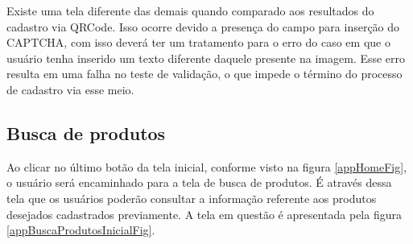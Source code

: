 Existe uma tela diferente das demais quando comparado aos resultados do cadastro via QRCode. Isso ocorre devido a presença do campo para inserção do CAPTCHA, com isso deverá ter um tratamento para o erro do caso em que o usuário tenha inserido um texto diferente daquele presente na imagem. Esse erro resulta em uma falha no teste de validação, o que impede o término do processo de cadastro via esse meio.

\subsection{Busca de produtos}

Ao clicar no último botão da tela inicial, conforme visto na figura \ref{appHomeFig}, o usuário será encaminhado para a tela de busca de produtos. É através dessa tela que os usuários poderão consultar a informação referente aos produtos desejados cadastrados previamente. A tela em questão é apresentada pela figura \ref{appBuscaProdutosInicialFig}.

